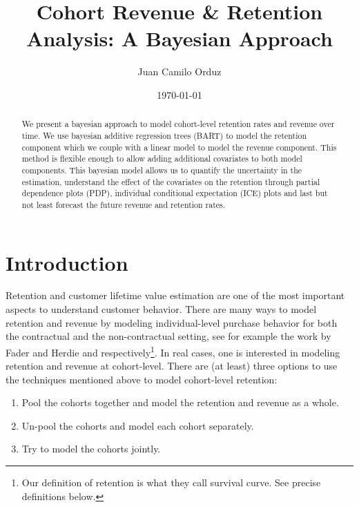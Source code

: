 \documentclass[11pt]{amsart}
\theoremstyle{definition}
\begin{document}
\title{Cohort Revenue \& Retention Analysis: A Bayesian Approach}
\author{Juan Camilo Orduz}
\address{Berlin, Germany}
\date{\today}

\begin{abstract}
We present a bayesian approach to model cohort-level retention rates and revenue over
time. We use bayesian additive regression trees (BART) to model the retention
component which we couple with a linear model to model the revenue component.
This method is flexible enough to allow adding additional covariates to both model
components. This bayesian model allows us to quantify the uncertainty in the
estimation, understand the effect of the covariates on the retention through partial
dependence plots (PDP), individual conditional expectation (ICE) plots and last but not
least forecast the future revenue and retention rates.
\end{abstract}

\maketitle

\tableofcontents
{}

\section{Introduction}

Retention and customer lifetime value estimation are one of the most important aspects
to understand customer behavior. There are many ways to model retention and revenue 
by modeling individual-level purchase behavior for both the contractual and the
non-contractual setting, see for example the work by Fader and Herdie
\cite{FaderHardie2007} and \cite{FaderHardie2005} respectively\footnote{Our definition
of retention is what they call survival curve. See precise definitions below.}. In real
cases, one is interested in modeling retention and revenue at cohort-level. There are
(at least) three options to use the techniques mentioned above to model cohort-level
retention:

\begin{enumerate}
    \item Pool the cohorts together and model the retention and revenue as a whole.
    \item Un-pool the cohorts and model each cohort separately.
    \item Try to model the cohorts jointly.
\end{enumerate}
\end{document}
